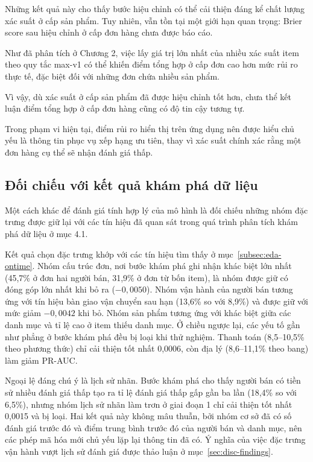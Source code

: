\documentclass[12pt,a4paper]{report}
\begin{document}
Những kết quả này cho thấy bước hiệu chỉnh có thể cải thiện đáng kể chất lượng xác suất ở cấp sản phẩm. Tuy nhiên, vẫn tồn tại một giới hạn quan trọng: Brier score sau hiệu chỉnh ở cấp đơn hàng chưa được báo cáo.

Như đã phân tích ở Chương 2, việc lấy giá trị lớn nhất của nhiều xác suất item theo quy tắc max-v1 có thể khiến điểm tổng hợp ở cấp đơn cao hơn mức rủi ro thực tế, đặc biệt đối với những đơn chứa nhiều sản phẩm.

Vì vậy, dù xác suất ở cấp sản phẩm đã được hiệu chỉnh tốt hơn, chưa thể kết luận điểm tổng hợp ở cấp đơn hàng cũng có độ tin cậy tương tự.

Trong phạm vi hiện tại, điểm rủi ro hiển thị trên ứng dụng nên được hiểu chủ yếu là thông tin phục vụ xếp hạng ưu tiên, thay vì xác suất chính xác rằng một đơn hàng cụ thể sẽ nhận đánh giá thấp.

\subsection{Đối chiếu với kết quả khám phá dữ liệu}\label{sec:analysis-eda}

Một cách khác để đánh giá tính hợp lý của mô hình là đối chiếu những nhóm đặc trưng được giữ lại với các tín hiệu đã quan sát trong quá trình phân tích khám phá dữ liệu ở mục 4.1.

Kết quả chọn đặc trưng khớp với các tín hiệu tìm thấy ở mục~\ref{subsec:eda-ontime}. Nhóm cấu trúc đơn, nơi bước khám phá ghi nhận khác biệt lớn nhất (45,7\% ở đơn hai người bán, 31,9\% ở đơn từ bốn item), là nhóm được giữ có đóng góp lớn nhất khi bỏ ra ($-0{,}0050$). Nhóm vận hành của người bán tương ứng với tín hiệu bàn giao vận chuyển sau hạn (13,6\% so với 8,9\%) và được giữ với mức giảm $-0{,}0042$ khi bỏ. Nhóm sản phẩm tương ứng với khác biệt giữa các danh mục và tỉ lệ cao ở item thiếu danh mục. Ở chiều ngược lại, các yếu tố gần như phẳng ở bước khám phá đều bị loại khi thử nghiệm. Thanh toán (8,5--10,5\% theo phương thức) chỉ cải thiện tốt nhất 0,0006, còn địa lý (8,6--11,1\% theo bang) làm giảm PR-AUC.

Ngoại lệ đáng chú ý là lịch sử nhãn. Bước khám phá cho thấy người bán có tiền sử nhiều đánh giá thấp tạo ra tỉ lệ đánh giá thấp gấp gần ba lần (18,4\% so với 6,5\%), nhưng nhóm lịch sử nhãn làm trơn ở giai đoạn 1 chỉ cải thiện tốt nhất 0,0015 và bị loại. Hai kết quả này không mâu thuẫn, bởi nhóm cơ sở đã có số đánh giá trước đó và điểm trung bình trước đó của người bán và danh mục, nên các phép mã hóa mới chủ yếu lặp lại thông tin đã có. Ý nghĩa của việc đặc trưng vận hành vượt lịch sử đánh giá được thảo luận ở mục~\ref{sec:disc-findings}.
\end{document}
